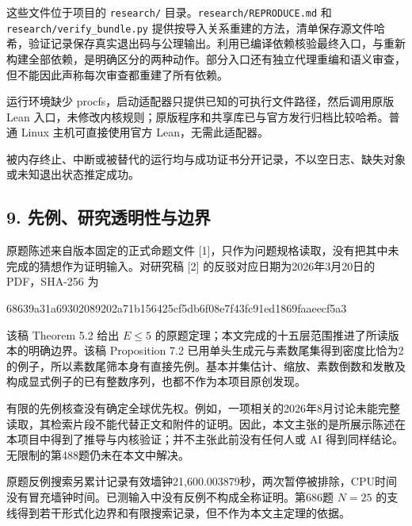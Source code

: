 \documentclass[
  11pt,
]{article}
\newenvironment{Shaded}{}{}
\newcommand{\NormalTok}[1]{#1}
\begin{document}
这些文件位于项目的 \texttt{research/\allowbreak{}}
目录。\texttt{research/\allowbreak{}REPRODUCE.\allowbreak{}md} 和
\texttt{research/\allowbreak{}verify\_\allowbreak{}bundle.\allowbreak{}py}
提供按导入关系重建的方法，清单保存源文件哈希，验证记录保存真实退出码与公理输出。利用已编译依赖核验最终入口，与重新构建全部依赖，是明确区分的两种动作。部分入口还有独立代理重编和语义审查，但不能因此声称每次审查都重建了所有依赖。

运行环境缺少 procfs，启动适配器只提供已知的可执行文件路径，然后调用原版
Lean
入口，未修改内核规则；原版程序和共享库已与官方发行归档比较哈希。普通
Linux 主机可直接使用官方 Lean，无需此适配器。

被内存终止、中断或被替代的运行均与成功证书分开记录，不以空日志、缺失对象或未知退出状态推定成功。

\hypertarget{ux5148ux4f8bux7814ux7a76ux900fux660eux6027ux4e0eux8fb9ux754c}{%
\subsection{9.
先例、研究透明性与边界}\label{ux5148ux4f8bux7814ux7a76ux900fux660eux6027ux4e0eux8fb9ux754c}}

原题陈述来自版本固定的正式命题文件
{[}1{]}，只作为问题规格读取，没有把其中未完成的猜想作为证明输入。对研究稿
{[}2{]} 的反驳对应日期为2026年3月20日的 PDF，SHA-256 为

\begin{Shaded}
\begin{Highlighting}[]
\NormalTok{68639a31a69302089202a71b156425cf5db6f08e7f43fc91ed1869faaeecf5a3}
\end{Highlighting}
\end{Shaded}

该稿 Theorem 5.2 给出 \(E\le5\)
的原题定理；本文完成的十五层范围推进了所读版本的明确边界。该稿
Proposition 7.2
已用单头生成元与素数尾集得到密度比恰为2的例子，所以素数尾筛本身有直接先例。基本并集估计、缩放、素数倒数和发散及构成显式例子的已有整数序列，也都不作为本项目原创发现。

有限的先例核查没有确定全球优先权。例如，一项相关的2026年8月讨论未能完整读取，其检索片段不能代替正文和附件的证明。因此，本文主张的是所展示陈述在本项目中得到了推导与内核验证；并不主张此前没有任何人或
AI 得到同样结论。无限制的第488题仍未在本文中解决。

原题反例搜索另累计记录有效墙钟21,600.003879秒，两次暂停被排除，CPU时间没有冒充墙钟时间。已测输入中没有反例不构成全称证明。第686题
\(N=25\)
的支线得到若干形式化边界和有限搜索记录，但不作为本文主定理的依据。
\end{document}
